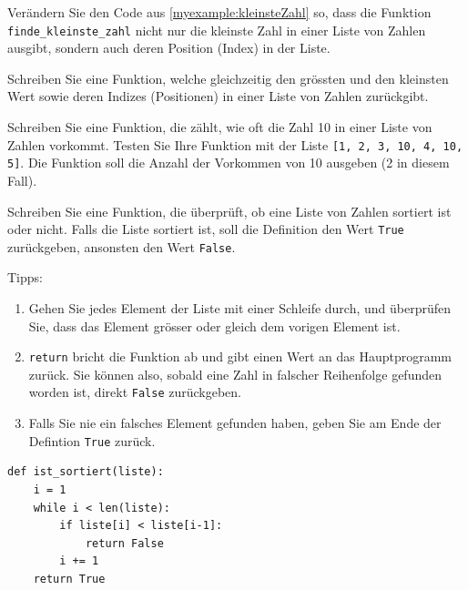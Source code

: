 \begin{myexercise}
    Verändern Sie den Code aus \cref{myexample:kleinsteZahl} so, dass die Funktion \lstinline|finde_kleinste_zahl| nicht nur die kleinste Zahl in einer Liste von Zahlen ausgibt, sondern auch deren Position (Index) in der Liste.
    \begin{myanswer}
        
    \end{myanswer}
\end{myexercise}

\begin{myexercise}
    Schreiben Sie eine Funktion, welche gleichzeitig den grössten und den kleinsten Wert sowie deren Indizes (Positionen) in einer Liste von Zahlen zurückgibt.
    \begin{myanswer}
        
    \end{myanswer}
\end{myexercise}

\begin{myexercise}
    Schreiben Sie eine Funktion, die zählt, wie oft die Zahl 10 in einer Liste von Zahlen vorkommt. Testen Sie Ihre Funktion mit der Liste \lstinline|[1, 2, 3, 10, 4, 10, 5]|. Die Funktion soll die Anzahl der Vorkommen von 10 ausgeben (2 in diesem Fall).
    \begin{myanswer}
        
    \end{myanswer}
\end{myexercise}

\begin{mychallenge}
    Schreiben Sie eine Funktion, die überprüft, ob eine Liste von Zahlen sortiert ist oder nicht. Falls die Liste sortiert ist, soll die Definition den Wert \lstinline|True| zurückgeben, ansonsten den Wert \lstinline|False|.

    Tipps:
    \begin{enumerate}
        \item Gehen Sie jedes Element der Liste mit einer Schleife durch, und überprüfen Sie, dass das Element grösser oder gleich dem vorigen Element ist.
        \item \lstinline|return| bricht die Funktion ab und gibt einen Wert an das Hauptprogramm zurück. Sie können also, sobald eine Zahl in falscher Reihenfolge gefunden worden ist, direkt \lstinline|False| zurückgeben.
        \item Falls Sie nie ein falsches Element gefunden haben, geben Sie am Ende der Defintion \lstinline|True| zurück.
    \end{enumerate}
    \begin{myanswer}
        \begin{lstlisting}
def ist_sortiert(liste):
    i = 1
    while i < len(liste):
        if liste[i] < liste[i-1]:
            return False
        i += 1
    return True
\end{lstlisting}
    \end{myanswer}
\end{mychallenge}

